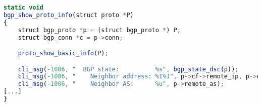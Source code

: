 \begin{lstlisting}[language=javascript,label={lst:bgpcode},caption={bgp\_show\_proto\_info function in BGP.c.}]
static void
bgp_show_proto_info(struct proto *P)
{
    struct bgp_proto *p = (struct bgp_proto *) P;
    struct bgp_conn *c = p->conn;

    proto_show_basic_info(P);

    cli_msg(-1006, "  BGP state:          %s", bgp_state_dsc(p));
    cli_msg(-1006, "    Neighbor address: %I%J", p->cf->remote_ip, p->cf->iface);
    cli_msg(-1006, "    Neighbor AS:      %u", p->remote_as);
[...]
}
\end{lstlisting}